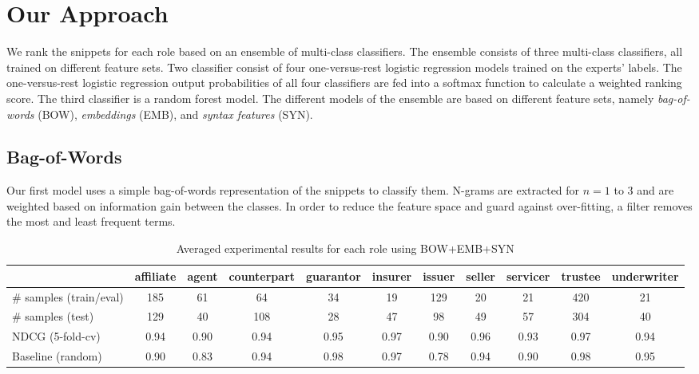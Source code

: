 \section{Our Approach}
We rank the snippets for each role based on an ensemble of multi-class classifiers.
The ensemble consists of three multi-class classifiers, all trained on different feature sets.
Two classifier consist of four one-versus-rest logistic regression models trained on the experts' labels.
The one-versus-rest logistic regression output probabilities of all four classifiers are fed into a softmax function to calculate a weighted ranking score.
The third classifier is a random forest model.
The different models of the ensemble are based on different feature sets, namely \emph{bag-of-words} (BOW), \emph{embeddings} (EMB), and \emph{syntax features} (SYN).


\subsection{Bag-of-Words}

Our first model uses a simple bag-of-words representation of the snippets to classify them.
N-grams are extracted for $n=1$ to $3$ and are weighted based on information gain between the classes.
In order to reduce the feature space and guard against over-fitting, a filter removes the most and least frequent terms.

\begin{table}[tb]
	\caption{Averaged experimental results for each role using BOW+EMB+SYN}
	\label{tab:roleresults}
	\begin{tabular}{lcccccccccc}
		\toprule
		& affiliate & agent & counterpart & guarantor & insurer & issuer & seller & servicer & trustee & underwriter \\
		\midrule %
               \# samples (train/eval) & 185  & 61   & 64   & 34   & 19   & 129  & 20   & 21   & 420  & 21   \\
               \# samples (test)       & 129  & 40   & 108  & 28   & 47   & 98   & 49   & 57   & 304  & 40   \\
               NDCG (5-fold-cv)        & 0.94 & 0.90 & 0.94 & 0.95 & 0.97 & 0.90 & 0.96  & 0.93 & 0.97 & 0.94  \\
               Baseline (random)       & 0.90 & 0.83 & 0.94 & 0.98 & 0.97 & 0.78 & 0.94 & 0.90 & 0.98 & 0.95 \\
		\bottomrule
	\end{tabular}
\end{table}

